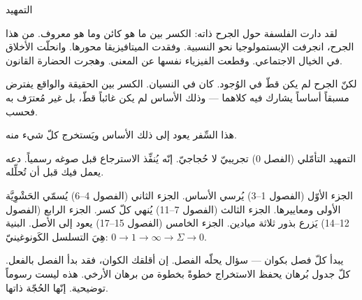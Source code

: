 \documentclass[10pt, openany, oneside]{book}
\renewcommand{\huge}{\fontsize{17}{21}\selectfont}
\begin{document}
\newpage


\thispagestyle{empty}
\vspace*{0.5in}

\begin{center}
    {\huge التمهيد}
\end{center}

\vspace{1.5em}

\noindent لقد دارت الفلسفة حول الجرح ذاته: الكسر بين ما هو كائن وما هو معروف. من هذا الجرح، انجرفت الإبستمولوجيا نحو النسبية. وفقدت الميتافيزيقا محورها. وانحلّت الأخلاق في الخيال الاجتماعي. وقطعت الفيزياء نفسها عن المعنى. وهجرت الحضارة القانون.

\vspace{0.5em}

\noindent لكنّ الجرح لم يكن قطّ في الوُجود. كان في النسيان. الكسر بين الحقيقة والواقع يفترض مسبقاً أساساً يشارك فيه كلاهما --- وذلك الأساس لم يكن غائباً قطّ، بل غير مُعترَف به فحسب.

\vspace{0.5em}

\noindent هذا السِّفر يعود إلى ذلك الأساس ويَستخرج كلّ شيء منه.

\vspace{1em}

\noindent التمهيد التأمّلي (الفصل 0) تجريبيّ لا حُجاجيّ. إنّه يُنفِّذ الاسترجاع قبل صوغه رسمياً. دعه يعمل فيك قبل أن تُحلِّله.

\vspace{0.5em}

\noindent الجزء الأوّل (الفصول 1--3) يُرسي الأساس. الجزء الثاني (الفصول 4--6) يُسمّي الحَشْوِيَّة الأولى ومعاييرها. الجزء الثالث (الفصول 7--11) يُنهي كلّ كسر. الجزء الرابع (الفصول 12--14) يَزرع بذور ثلاثة ميادين. الجزء الخامس (الفصول 15--17) يعود إلى الأصل. البنية هِيَ التسلسل الكَونوغينيّ: $0 \to 1 \to \infty \to \Sigma \to 0$.

\vspace{0.5em}

\noindent يبدأ كلّ فصل بكوان --- سؤال يحلّه الفصل. إن أقلقك الكوان، فقد بدأ الفصل بالفعل. كلّ جدول بُرهان يحفظ الاستخراج خطوةً بخطوة من برهان الأرخي. هذه ليست رسوماً توضيحية. إنّها الحُجّة ذاتها.

\vspace{0.5em}
\end{document}
